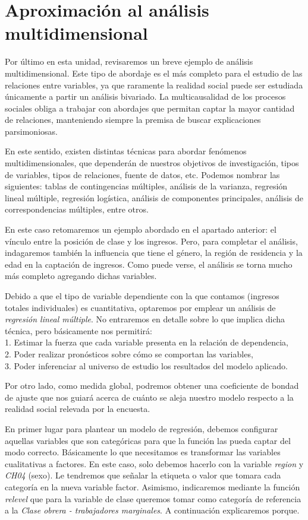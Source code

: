 \documentclass[
]{book}
\begin{document}
\hypertarget{aprox}{%
\section{Aproximación al análisis multidimensional}\label{aprox}}

Por último en esta unidad, revisaremos un breve ejemplo de análisis multidimensional. Este tipo de abordaje es el más completo para el estudio de las relaciones entre variables, ya que raramente la realidad social puede ser estudiada únicamente a partir un análisis bivariado. La multicausalidad de los procesos sociales obliga a trabajar con abordajes que permitan captar la mayor cantidad de relaciones, manteniendo siempre la premisa de buscar explicaciones parsimoniosas.

En este sentido, existen distintas técnicas para abordar fenómenos multidimensionales, que dependerán de nuestros objetivos de investigación, tipos de variables, tipos de relaciones, fuente de datos, etc. Podemos nombrar las siguientes: tablas de contingencias múltiples, análisis de la varianza, regresión lineal múltiple, regresión logística, análisis de componentes principales, análisis de correspondencias múltiples, entre otros.

En este caso retomaremos un ejemplo abordado en el apartado anterior: el vínculo entre la posición de clase y los ingresos. Pero, para completar el análisis, indagaremos también la influencia que tiene el género, la región de residencia y la edad en la captación de ingresos. Como puede verse, el análisis se torna mucho más completo agregando dichas variables.

Debido a que el tipo de variable dependiente con la que contamos (ingresos totales individuales) es cuantitativa, optaremos por emplear un análisis de \emph{regresión lineal múltiple}. No entraremos en detalle sobre lo que implica dicha técnica, pero básicamente nos permitirá:\\
1. Estimar la fuerza que cada variable presenta en la relación de dependencia,\\
2. Poder realizar pronósticos sobre cómo se comportan las variables,\\
3. Poder inferenciar al universo de estudio los resultados del modelo aplicado.

Por otro lado, como medida global, podremos obtener una coeficiente de bondad de ajuste que nos guiará acerca de cuánto se aleja nuestro modelo respecto a la realidad social relevada por la encuesta.

En primer lugar para plantear un modelo de regresión, debemos configurar aquellas variables que son categóricas para que la función las pueda captar del modo correcto. Básicamente lo que necesitamos es transformar las variables cualitativas a factores. En este caso, solo debemos hacerlo con la variable \emph{region} y \emph{CH04} (sexo). Le tendremos que señalar la etiqueta o valor que tomara cada categoría en la nueva variable factor. Asimismo, indicaremos mediante la función \emph{relevel} que para la variable de clase queremos tomar como categoría de referencia a la \emph{Clase obrera - trabajadores marginales}. A continuación explicaremos porque.
\end{document}
